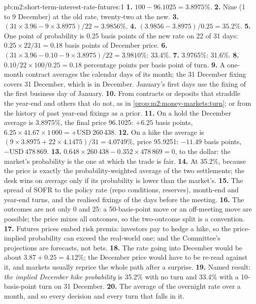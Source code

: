 \begin{solution}{pb:m2:short-term-interest-rate-futures:1}
\textbf{1.} $100 - 96.1025 = 3.8975\%$.
\textbf{2.} Nine (1 to 9 December) at the old rate, twenty-two at the new.
\textbf{3.} $(31 \times 3.96 - 9 \times 3.8975)/22 = 3.9856\%$.
\textbf{4.} $(3.9856 - 3.8975)/0.25 = 35.2\%$.
\textbf{5.} One point of probability is 0.25 basis points of the new rate on 22 of
31 days: $0.25 \times 22/31 = 0.18$ basis points of December price.
\textbf{6.} $(31 \times 3.96 - 0.10 - 9 \times 3.8975)/22 = 3.9810\%$: 33.4\%.
\textbf{7.} 3.9765\%: 31.6\%.
\textbf{8.} $0.10/22 \times 100/0.25 = 0.18$ percentage points per basis point of
turn.
\textbf{9.} A one-month contract averages the calendar days of its month; the 31
December fixing covers 31 December, which is in December. January's first days
use the fixing of the first business day of January.
\textbf{10.} From contracts or deposits that straddle the year-end and others that
do not, as in \cref{prop:m2:money-markets:turn}; or from the history of past
year-end fixings as a prior.
\textbf{11.} On a hold the December average is 3.8975\%, the final price 96.1025:
$+6.25$ basis points, $6.25 \times 41.67 \times 1\,000 = +\text{USD}~260\,438$.
\textbf{12.} On a hike the average is $(9 \times 3.8975 + 22 \times 4.1475)/31 =
4.0749\%$, price 95.9251: $-11.49$ basis points, $-\text{USD}~478\,869$.
\textbf{13.} $0.648 \times 260\,438 - 0.352 \times 478\,869 = 0$, to the dollar: the
market's probability is the one at which the trade is fair.
\textbf{14.} At 35.2\%, because the price is exactly the probability-weighted
average of the two settlements; the desk wins on average only if its
probability is lower than the market's.
\textbf{15.} The spread of SOFR to the policy rate (repo conditions, reserves),
month-end and year-end turns, and the realised fixings of the days before the
meeting.
\textbf{16.} The outcomes are not only 0 and 25: a 50-basis-point move or an
off-meeting move are possible; the price mixes all outcomes, so the
two-outcome split is a convention.
\textbf{17.} Futures prices embed risk premia: investors pay to hedge a hike, so
the price-implied probability can exceed the real-world one; and the
Committee's projections are forecasts, not bets.
\textbf{18.} The rate going into December would be about $3.87 + 0.25 = 4.12\%$; the December price
would have to be re-read against it, and markets usually reprice the whole
path after a surprise.
\textbf{19.} Named result: \emph{the implied December hike probability} is 35.2\% with
no turn and 33.4\% with a 10-basis-point turn on 31 December.
\textbf{20.} The average of the overnight rate over a month, and so every
decision and every turn that falls in it.
\end{solution}

